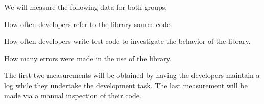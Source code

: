 \documentclass[letterpaper,12pt]{article}
\let\Itemize =\itemize
\def\Nospacing{\itemsep=0pt\topsep=0pt\partopsep=0pt\parskip=0pt\parsep=0pt}
\renewenvironment{itemize}{\Itemize\Nospacing}{\endlist}
\begin{document}
We will measure the following data for both groups:

\begin{itemize}
\item How often developers refer to the library source code.

\item How often developers write test code to investigate the behavior of the
  library.

\item How many errors were made in the use of the library.
\end{itemize}

The first two measurements will be obtained by having the developers maintain a
log while they undertake the development task. The last measurement will be
made via a manual inspection of their code.
\end{document}

